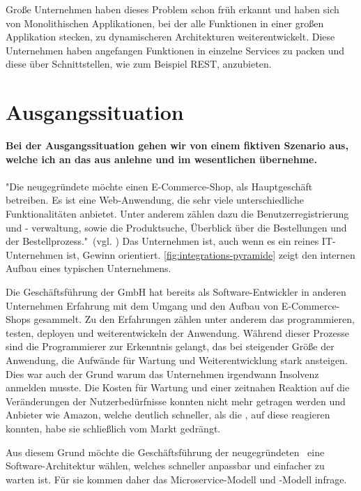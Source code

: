 Große Unternehmen haben dieses Problem schon früh erkannt und haben sich von Monolithischen Applikationen, bei der alle Funktionen in einer großen Applikation stecken, zu dynamischeren Architekturen weiterentwickelt. Diese Unternehmen haben angefangen Funktionen in einzelne Services zu packen und diese über Schnittstellen, wie zum Beispiel REST, anzubieten.

\section{Ausgangssituation}
\label{sec:ausgangssituation}
\textbf{Bei der Ausgangssituation gehen wir von einem fiktiven Szenario aus, welche ich an das aus \cite[S. 15]{EWolff2016:Microservices} anlehne und im wesentlichen übernehme.}
\\\\ 
"Die neugegründete \textit{\gmbh} möchte einen E-Commerce-Shop, als Hauptgeschäft betreiben. Es ist eine Web-Anwendung, die sehr viele unterschiedliche Funktionalitäten anbietet. Unter anderem zählen dazu die Benutzerregistrierung und - verwaltung, sowie die Produktsuche, Überblick über die Bestellungen und der Bestellprozess."\ (vgl. \cite[S. 15]{EWolff2016:Microservices})
Das Unternehmen ist, auch wenn es ein reines IT-Unternehmen ist, Gewinn orientiert. \ref{fig:integrations-pyramide} zeigt den internen Aufbau eines typischen Unternehmens.

Die Geschäftsführung der GmbH hat bereits als Software-Entwickler in anderen Unternehmen Erfahrung mit dem Umgang und den Aufbau von E-Commerce-Shops gesammelt. Zu den Erfahrungen zählen unter anderem das programmieren, testen, deployen und weiterentwickeln der Anwendung. Während dieser Prozesse sind die Programmierer zur Erkenntnis gelangt, das bei steigender Größe der Anwendung, die Aufwände für Wartung und Weiterentwicklung stark ansteigen. Dies war auch der Grund warum das Unternehmen irgendwann Insolvenz anmelden musste. Die Kosten für Wartung und einer zeitnahen Reaktion auf die Veränderungen der Nutzerbedürfnisse konnten nicht mehr getragen werden und Anbieter wie Amazon, welche deutlich schneller, als die \gmbh ,  auf diese reagieren konnten, habe sie schließlich vom Markt gedrängt.

Aus diesem Grund möchte die Geschäftsführung der neugegründeten \gmbh\ eine Software-Architektur wählen, welches schneller anpassbar und einfacher zu warten ist. Für sie kommen daher das Microservice-Modell und \SOA -Modell infrage.

